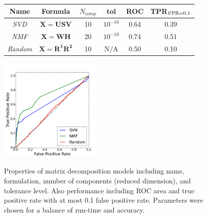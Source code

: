 \documentclass{article} %
\begin{document}
\begin{figure}[!h]

\begin{minipage}[b]{0.45\linewidth}
\centering

\begin{footnotesize}
\setlength{\tabcolsep}{5pt}
\renewcommand{\arraystretch}{2.85}
\begin{tabular}[b]{c c c c | c c}
    \hline
    Name & Formula & $N_{comp}$ & tol & ROC & TPR$_{{\rm FPR = } 0.1}$\\
    \hline
    {\it SVD} & $\mathbf{ X = USV}$ & 10 & $10^{-10}$ & 0.64 & 0.39 \\
    {\it NMF} & $\mathbf{ X = WH}$ & 20 & $10^{-10}$ & 0.74 & 0.51 \\
    {\it Random} & $\mathbf{ X = R^{1}R^{2}}$ & 10 & N/A & 0.50 & 0.10 \\
    \hline
\end{tabular}
\end{footnotesize}

\end{minipage}
\begin{minipage}[b]{0.8\linewidth}


\centering
  \includegraphics[width=0.45\textwidth]{ROC.png}
  \label{fig:roc}
\end{minipage}

\caption{Properties of matrix decomposition models including name, formulation, number of components (reduced dimension), and tolerance level. Also performance including ROC area and true positive rate with at most 0.1 false positive rate. Parameters were chosen for a balance of run-time and accuracy.}
\label{fig:matrix}
\end{figure}
\end{document}
